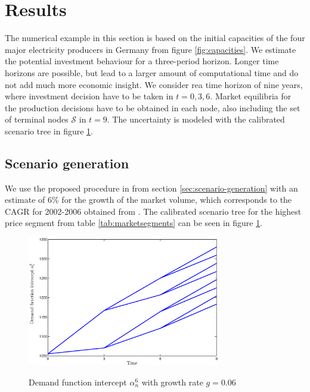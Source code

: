 \clearpage
\section{Results}
\label{sec:results}

The numerical example in this section is based on the initial capacities of the four major electricity producers in Germany from figure \ref{fig:capacities}. We estimate the potential investment behaviour for a three-period horizon. Longer time horizons are possible, but lead to a larger amount of computational time and do not add much more economic insight. We consider rea time horizon of nine years, where investment decision have to be taken in $t=0,3,6$. Market equilibria for the production decisions have to be obtained in each node, also including the set of terminal nodes $\mathcal{S}$ in $t=9$.  The uncertainty is modeled with the calibrated scenario tree in figure \ref{fig:intercept}.

\subsection{Scenario generation}

We use the proposed procedure in from section \ref{sec:scenario-generation} with an estimate of $6\%$ for the growth of the market volume, which corresponds to the CAGR for 2002-2006 obtained from \cite{Datamonitor2007}. The calibrated scenario tree for the highest price segment from table \ref{tab:marketsegments} can be seen in figure \ref{fig:intercept}.

\begin{figure}[htb]
  \centering
\caption{Demand function intercept $\alpha_n^6$ with growth rate $g=0.06$}
  \includegraphics[width=0.75\textwidth]{intercept}
  \label{fig:intercept}
\end{figure}

